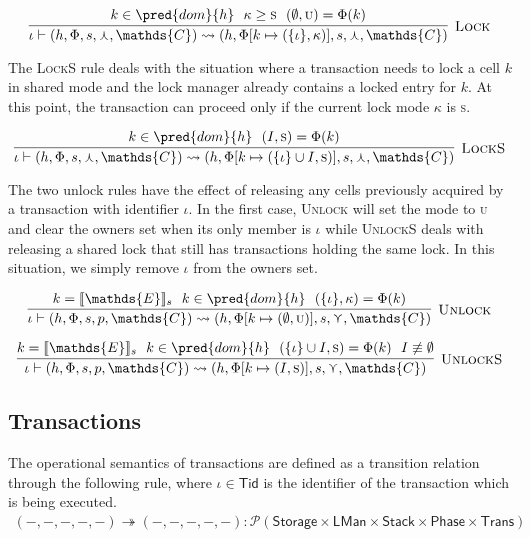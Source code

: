 \[
\infer[\textsc{Lock}]
{
	\iota \vdash (h, \Phi, s, \curlywedge, \mathds{C})
	\rightsquigarrow
	(h, \Phi[k \mapsto (\{\iota\}, \kappa)], s, \curlywedge, \mathds{C})
}
{
	k \in \pred{dom}{h}\ \
	\kappa \geq \textsc{s}\ \
	(\emptyset, \textsc{u}) = \Phi(k)
}
\]

The \textsc{LockS} rule deals with the situation where a transaction needs to lock a cell $k$ in shared mode and the lock manager already contains a locked entry for $k$. At this point, the transaction can proceed only if the current lock mode $\kappa$ is \textsc{s}.

\[
\infer[\textsc{LockS}]
{
	\iota \vdash (h, \Phi, s, \curlywedge, \mathds{C})
	\rightsquigarrow
	(h, \Phi[k \mapsto (\{\iota\} \cup I, \textsc{s})], s, \curlywedge, \mathds{C})
}
{
	k \in \pred{dom}{h}\ \
	(I, \textsc{s}) = \Phi(k)
}
\]

The two unlock rules have the effect of releasing any cells previously acquired by a transaction with identifier $\iota$. In the first case, \textsc{Unlock} will set the mode to \textsc{u} and clear the owners set when its only member is $\iota$ while \textsc{UnlockS} deals with releasing a shared lock that still has transactions holding the same lock. In this situation, we simply remove $\iota$ from the owners set.

\[
\infer[\textsc{Unlock}]
{
	\iota \vdash (h, \Phi, s, p, \mathds{C})
	\rightsquigarrow
	(h, \Phi[k \mapsto (\emptyset, \textsc{u})], s, \curlyvee, \mathds{C})
}
{
	k = \llbracket \mathds{E} \rrbracket_s\ \
	k \in \pred{dom}{h}\ \
	(\{\iota\}, \kappa) = \Phi(k)
}
\]

\[
\infer[\textsc{UnlockS}]
{
	\iota \vdash (h, \Phi, s, p, \mathds{C})
	\rightsquigarrow
	(h, \Phi[k \mapsto (I, \textsc{s})], s, \curlyvee, \mathds{C})
}
{
	k = \llbracket \mathds{E} \rrbracket_s\ \
	k \in \pred{dom}{h}\ \
	(\{\iota\} \cup I, \textsc{s}) = \Phi(k)\ \
	I \not\equiv \emptyset
}
\]

\subsection{Transactions}
The operational semantics of transactions are defined as a transition relation through the following rule, where $\iota \in \mathsf{Tid}$ is the identifier of the transaction which is being executed.
\begin{gather*}
(-, -, -, -, -) \twoheadrightarrow (-, -, -, -, -) : \mathcal{P}(\mathsf{Storage} \times \mathsf{LMan} \times \mathsf{Stack} \times \mathsf{Phase} \times \mathsf{Trans})
\end{gather*}

